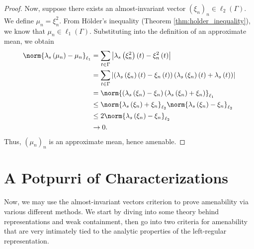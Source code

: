 \begin{proof}
  Now, suppose there exists an almost-invariant vector $\left( \xi_n \right)_n\in \ell_2\left( \Gamma \right)$. We define $\mu_n = \xi_n^2$. From Hölder's inequality (Theorem \ref{thm:holder_inequality}), we know that $\mu_n\in \ell_1\left( \Gamma \right)$. Substituting into the definition of an approximate mean, we obtain
  \begin{align*}
    \norm{\lambda_s\left( \mu_n \right) - \mu_n}_{\ell_1} &= \sum_{t\in\Gamma}\left\vert \lambda_s\left( \xi_n^2 \right)\left( t \right) - \xi_n^2\left( t \right)\right\vert\\
                                                          &= \sum_{t\in\Gamma}\left\vert \left( \lambda_s\left( \xi_n \right)(t) - \xi_n\left( t \right) \right)\left( \lambda_s\left( \xi_n \right)(t) + \lambda_s\left( t \right) \right) \right\vert\\
                                                          &= \norm{\left( \lambda_s\left( \xi_n \right) - \xi_n \right)\left( \lambda_s\left( \xi_n \right) + \xi_n \right)}_{\ell_1}\\
                                                          &\leq\norm{\lambda_s\left( \xi_n \right) + \xi_n}_{\ell_2} \norm{\lambda_s\left( \xi_n \right) - \xi_n}_{\ell_2}\\
                                                          &\leq 2\norm{\lambda_s\left( \xi_n \right) - \xi_n}_{\ell_2}\\
                                                          &\rightarrow 0.
  \end{align*}
  Thus, $\left( \mu_n \right)_n$ is an approximate mean, hence amenable.
\end{proof}
\section{A Potpurri of Characterizations}%
Now, we may use the almost-invariant vectors criterion to prove amenability via various different methods. We start by diving into some theory behind representations and weak containment, then go into two criteria for amenability that are very intimately tied to the analytic properties of the left-regular representation.
